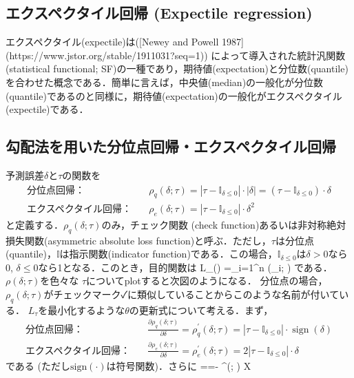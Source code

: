\subsection{エクスペクタイル回帰 (Expectile regression)}
エクスペクタイル(expectile)は([Newey and Powell 1987](https://www.jstor.org/stable/1911031?seq=1)) によって導入された統計汎関数 (statistical functional; SF)の一種であり，期待値(expectation)と分位数(quantile)を合わせた概念である．簡単に言えば，中央値(median)の一般化が分位数(quantile)であるのと同様に，期待値(expectation)の一般化がエクスペクタイル(expectile)である．
\subsection{勾配法を用いた分位点回帰・エクスペクタイル回帰}
予測誤差$\delta$と$\tau$の関数を
\begin{align}
\text{分位点回帰：}&\quad
\rho_q(\delta; \tau)=\left|\tau-\mathbb{I}_{\delta \leq 0}\right|\cdot |\delta|=\left(\tau-\mathbb{I}_{\delta \leq 0}\right)\cdot \delta\\
\text{エクスペクタイル回帰：}&\quad
\rho_e(\delta; \tau)=\left|\tau-\mathbb{I}_{\delta \leq 0}\right|\cdot \delta^2
\end{align}
と定義する．$\rho_q(\delta; \tau)$のみ，チェック関数 (check function)あるいは非対称絶対損失関数(asymmetric absolute loss function)と呼ぶ．ただし，$\tau$は分位点(quantile)，$\mathbb{I}$は指示関数(indicator function)である．この場合，$\mathbb{I}_{\delta \leq 0}$は$\delta \gt 0$なら0, $\delta \leq 0$なら1となる．このとき，目的関数は 
L_{\tau}(\delta)
=\sum_{i=1}^n \rho(\delta_i; \tau)
である．$\rho(\delta; \tau)$を色々な $\tau$についてplotすると次図のようになる．
分位点の場合，$\rho_q(\delta; \tau)$がチェックマーク✓に類似していることからこのような名前が付いている．
$L_\tau$を最小化するような$\theta$の更新式について考える．まず，
\begin{align}
\text{分位点回帰：}&\quad
\frac{\partial \rho_q(\delta; \tau)}{\partial \delta}= \rho_q^{\prime}(\delta; \tau)=\left|\tau-\mathbb{I}_{\delta \leq 0}\right| \cdot
\operatorname{sign}(\delta)\\
\text{エクスペクタイル回帰：}&\quad
\frac{\partial \rho_e(\delta; \tau)}{\partial \delta}= \rho_e^{\prime}(\delta; \tau)=2\left|\tau-\mathbb{I}_{\delta \leq 0}\right| \cdot
\delta
\end{align}
である (ただし$\text{sign}(\cdot)$は符号関数)．さらに
=\frac{\partial \delta(\theta)}{\partial \theta}=- \rho^{\prime}(\delta; \tau) X
 
